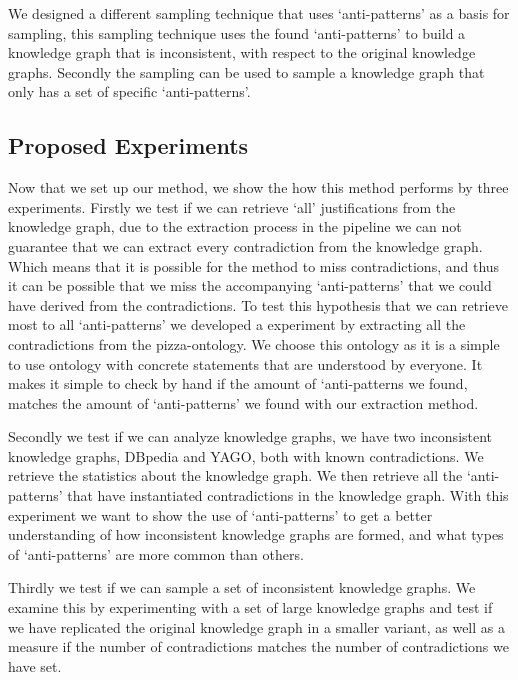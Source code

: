 \documentclass[11pt,letterpaper ,oneside ]{book}
\begin{document}
We designed a different sampling technique that uses `anti-patterns' as a basis for sampling, this sampling technique uses the found `anti-patterns' to build a knowledge graph that is inconsistent, with respect to the original knowledge graphs. Secondly the sampling can be used to sample a knowledge graph that only has a set of specific `anti-patterns'.

\subsection{Proposed Experiments}
Now that we set up our method, we show the how this method performs by three experiments. 
Firstly we test if we can retrieve `all' justifications from the knowledge graph, due to the extraction process in the pipeline we can not guarantee that we can extract every contradiction from the knowledge graph. Which means that it is possible for the method to miss contradictions, and thus it can be possible that we miss the accompanying `anti-patterns' that we could have derived from the contradictions. To test this hypothesis that we can retrieve most to all `anti-patterns' we developed a experiment by extracting all the contradictions from the pizza-ontology. We choose this ontology as it is a simple to use ontology with concrete statements that are understood by everyone. It makes it simple to check by hand if the amount of `anti-patterns we found, matches the amount of `anti-patterns' we found with our extraction method.

Secondly we test if we can analyze knowledge graphs, we have two inconsistent knowledge graphs, DBpedia and YAGO, both with known contradictions. We retrieve the statistics about the knowledge graph. We then retrieve all the `anti-patterns' that have instantiated contradictions in the knowledge graph. 
With this experiment we want to show the use of `anti-patterns' to get a better understanding of how inconsistent knowledge graphs are formed, and what types of `anti-patterns' are more common than others.

Thirdly we test if we can sample a set of inconsistent knowledge graphs. We examine this by experimenting with a set of large knowledge graphs and test if we have replicated the original knowledge graph in a smaller variant, as well as a measure if the number of contradictions matches the number of contradictions we have set.

\newpage
\end{document}
